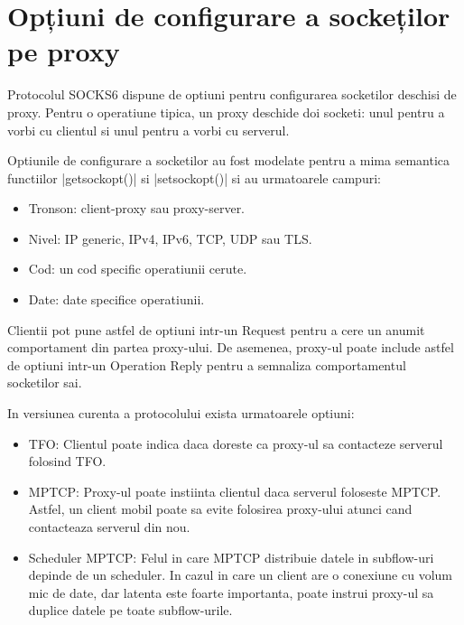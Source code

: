 \section{Opțiuni de configurare a sockeților pe proxy}

Protocolul SOCKS6 dispune de optiuni pentru configurarea socketilor deschisi de proxy.
Pentru o operatiune tipica, un proxy deschide doi socketi: unul pentru a vorbi cu clientul si unul pentru a vorbi cu serverul.

Optiunile de configurare a socketilor au fost modelate pentru a mima semantica functiilor |getsockopt()| si |setsockopt()| si au urmatoarele campuri:

\begin{itemize}
	\item Tronson: client-proxy sau proxy-server.
	\item Nivel: IP generic, IPv4, IPv6, TCP, UDP sau TLS.
	\item Cod: un cod specific operatiunii cerute.
	\item Date: date specifice operatiunii.
\end{itemize}

Clientii pot pune astfel de optiuni intr-un Request pentru a cere un anumit comportament din partea proxy-ului.
De asemenea, proxy-ul poate include astfel de optiuni intr-un Operation Reply pentru a semnaliza comportamentul socketilor sai.

In versiunea curenta a protocolului exista urmatoarele optiuni:
\begin{itemize}
	\item TFO: Clientul poate indica daca doreste ca proxy-ul sa contacteze serverul folosind TFO.
	\item MPTCP: Proxy-ul poate instiinta clientul daca serverul foloseste MPTCP. Astfel, un client mobil poate sa evite folosirea proxy-ului atunci cand contacteaza serverul din nou.
	\item Scheduler MPTCP: Felul in care MPTCP distribuie datele in subflow-uri depinde de un scheduler. In cazul in care un client are o conexiune cu volum mic de date, dar latenta este foarte importanta, poate instrui proxy-ul sa duplice datele pe toate subflow-urile.
\end{itemize}

